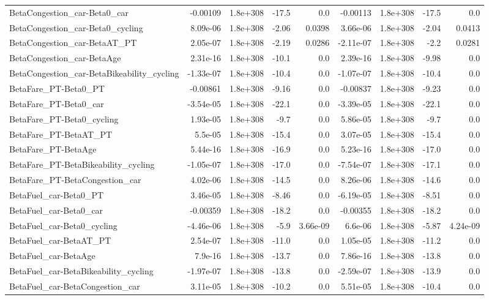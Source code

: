 \begin{tabular}{lrrrrrrrr}
BetaCongestion_car-Beta0_car & -0.00109 & 1.8e+308 & -17.5 & 0.0 & -0.00113 & 1.8e+308 & -17.5 & 0.0 \\
BetaCongestion_car-Beta0_cycling & 8.09e-06 & 1.8e+308 & -2.06 & 0.0398 & 3.66e-06 & 1.8e+308 & -2.04 & 0.0413 \\
BetaCongestion_car-BetaAT_PT & 2.05e-07 & 1.8e+308 & -2.19 & 0.0286 & -2.11e-07 & 1.8e+308 & -2.2 & 0.0281 \\
BetaCongestion_car-BetaAge & 2.31e-16 & 1.8e+308 & -10.1 & 0.0 & 2.39e-16 & 1.8e+308 & -9.98 & 0.0 \\
BetaCongestion_car-BetaBikeability_cycling & -1.33e-07 & 1.8e+308 & -10.4 & 0.0 & -1.07e-07 & 1.8e+308 & -10.4 & 0.0 \\
BetaFare_PT-Beta0_PT & -0.00861 & 1.8e+308 & -9.16 & 0.0 & -0.00837 & 1.8e+308 & -9.23 & 0.0 \\
BetaFare_PT-Beta0_car & -3.54e-05 & 1.8e+308 & -22.1 & 0.0 & -3.39e-05 & 1.8e+308 & -22.1 & 0.0 \\
BetaFare_PT-Beta0_cycling & 1.93e-05 & 1.8e+308 & -9.7 & 0.0 & 5.86e-05 & 1.8e+308 & -9.7 & 0.0 \\
BetaFare_PT-BetaAT_PT & 5.5e-05 & 1.8e+308 & -15.4 & 0.0 & 3.07e-05 & 1.8e+308 & -15.4 & 0.0 \\
BetaFare_PT-BetaAge & 5.44e-16 & 1.8e+308 & -16.9 & 0.0 & 5.23e-16 & 1.8e+308 & -17.0 & 0.0 \\
BetaFare_PT-BetaBikeability_cycling & -1.05e-07 & 1.8e+308 & -17.0 & 0.0 & -7.54e-07 & 1.8e+308 & -17.1 & 0.0 \\
BetaFare_PT-BetaCongestion_car & 4.02e-06 & 1.8e+308 & -14.5 & 0.0 & 8.26e-06 & 1.8e+308 & -14.6 & 0.0 \\
BetaFuel_car-Beta0_PT & 3.46e-05 & 1.8e+308 & -8.46 & 0.0 & -6.19e-05 & 1.8e+308 & -8.51 & 0.0 \\
BetaFuel_car-Beta0_car & -0.00359 & 1.8e+308 & -18.2 & 0.0 & -0.00355 & 1.8e+308 & -18.2 & 0.0 \\
BetaFuel_car-Beta0_cycling & -4.46e-06 & 1.8e+308 & -5.9 & 3.66e-09 & 6.6e-06 & 1.8e+308 & -5.87 & 4.24e-09 \\
BetaFuel_car-BetaAT_PT & 2.54e-07 & 1.8e+308 & -11.0 & 0.0 & 1.05e-05 & 1.8e+308 & -11.2 & 0.0 \\
BetaFuel_car-BetaAge & 7.9e-16 & 1.8e+308 & -13.7 & 0.0 & 7.86e-16 & 1.8e+308 & -13.8 & 0.0 \\
BetaFuel_car-BetaBikeability_cycling & -1.97e-07 & 1.8e+308 & -13.8 & 0.0 & -2.59e-07 & 1.8e+308 & -13.9 & 0.0 \\
BetaFuel_car-BetaCongestion_car & 3.11e-05 & 1.8e+308 & -10.2 & 0.0 & 5.51e-05 & 1.8e+308 & -10.4 & 0.0 \\

\end{tabular}
